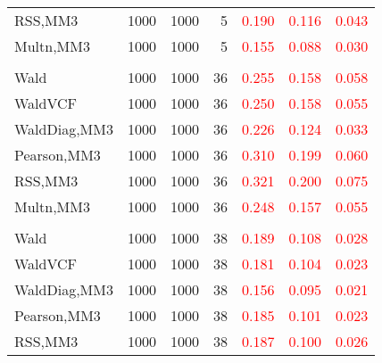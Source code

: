 \documentclass[
]{article}
\begin{document}
\begin{table}[H]
{\begin{tabular}[t]{lrrrrrr}
\hspace{1em}RSS,MM3 & 1000 & 1000 & 5 & \textcolor{red}{0.190} & \textcolor{red}{0.116} & \textcolor{red}{0.043}\\
\hspace{1em}Multn,MM3 & 1000 & 1000 & 5 & \textcolor{red}{0.155} & \textcolor{red}{0.088} & \textcolor{red}{0.030}\\
\addlinespace[0.3em]
\multicolumn{7}{l}{\textbf{1F 15V}}\\
\hspace{1em}Wald & 1000 & 1000 & 36 & \textcolor{red}{0.255} & \textcolor{red}{0.158} & \textcolor{red}{0.058}\\
\hspace{1em}WaldVCF & 1000 & 1000 & 36 & \textcolor{red}{0.250} & \textcolor{red}{0.158} & \textcolor{red}{0.055}\\
\hspace{1em}WaldDiag,MM3 & 1000 & 1000 & 36 & \textcolor{red}{0.226} & \textcolor{red}{0.124} & \textcolor{red}{0.033}\\
\hspace{1em}Pearson,MM3 & 1000 & 1000 & 36 & \textcolor{red}{0.310} & \textcolor{red}{0.199} & \textcolor{red}{0.060}\\
\hspace{1em}RSS,MM3 & 1000 & 1000 & 36 & \textcolor{red}{0.321} & \textcolor{red}{0.200} & \textcolor{red}{0.075}\\
\hspace{1em}Multn,MM3 & 1000 & 1000 & 36 & \textcolor{red}{0.248} & \textcolor{red}{0.157} & \textcolor{red}{0.055}\\
\addlinespace[0.3em]
\multicolumn{7}{l}{\textbf{2F 10V}}\\
\hspace{1em}Wald & 1000 & 1000 & 38 & \textcolor{red}{0.189} & \textcolor{red}{0.108} & \textcolor{red}{0.028}\\
\hspace{1em}WaldVCF & 1000 & 1000 & 38 & \textcolor{red}{0.181} & \textcolor{red}{0.104} & \textcolor{red}{0.023}\\
\hspace{1em}WaldDiag,MM3 & 1000 & 1000 & 38 & \textcolor{red}{0.156} & \textcolor{red}{0.095} & \textcolor{red}{0.021}\\
\hspace{1em}Pearson,MM3 & 1000 & 1000 & 38 & \textcolor{red}{0.185} & \textcolor{red}{0.101} & \textcolor{red}{0.023}\\
\hspace{1em}RSS,MM3 & 1000 & 1000 & 38 & \textcolor{red}{0.187} & \textcolor{red}{0.100} & \textcolor{red}{0.026}\\

\end{tabular}}
\end{table}
\end{document}
